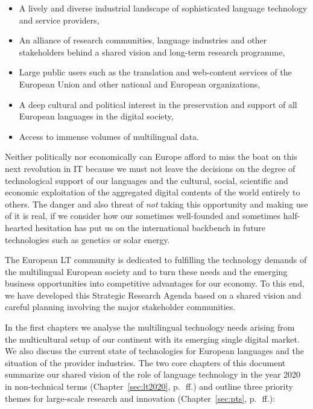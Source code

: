 \documentclass[10pt, plain]{../../metanetpaper}
\begin{document}
\begin{multicols}{2}
\begin{itemize}
\item A lively and diverse industrial landscape of sophisticated language technology and service providers,
\item An alliance of research communities, language industries and other stakeholders behind a shared vision and long-term research programme,
\item Large public users such as the translation and web-content services of the European Union and other national and European organizations,
\item A deep cultural and political interest in the preservation and support of all European languages in the digital society,
\item Access to immense volumes of multilingual data.
\end{itemize}

Neither politically nor economically can Europe afford to miss the boat on this next revolution in IT because we must not leave the decisions on the degree of technological support of our languages and the cultural, social, scientific and economic exploitation of the aggregated digital contents of the world entirely to others. The danger and also threat of \emph{not} taking this opportunity and making use of it is real, if we consider how our sometimes well-founded and sometimes half-hearted hesitation has put us on the international backbench in future technologies such as genetics or solar energy.

The European LT community is dedicated to fulfilling the technology demands of the multilingual European society and to turn these needs and the emerging business opportunities into competitive advantages for our economy. To this end, we have developed this Strategic Research Agenda based on a shared vision and careful planning involving the major stakeholder communities.

In the first chapters we analyse the multilingual technology needs arising from the multicultural setup of our continent with its emerging single digital market. We also discuss the current state of technologies for European languages and the situation of the provider industries. The two core chapters of this document summarize our shared vision of the role of language technology in the year 2020 in non-technical terms (Chapter~\ref{sec:lt2020}, p.~\pageref{sec:lt2020}\,ff.) and outline three priority themes for large-scale research and innovation (Chapter~\ref{sec:pts}, p.~\pageref{sec:pts}\,ff.):


\end{multicols}
\end{document}
